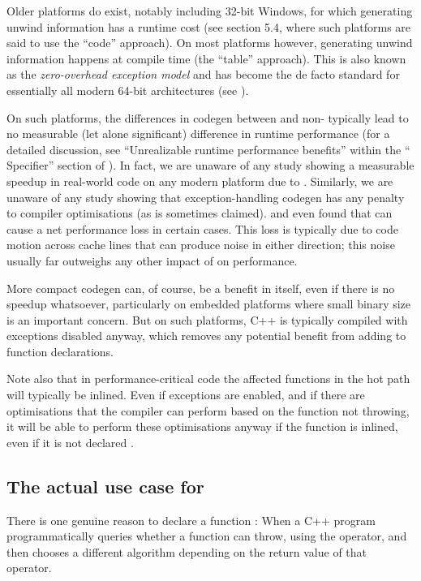 Older platforms do exist, notably including 32-bit Windows, for which generating unwind information has a runtime cost (see \cite{TR18015} section 5.4, where such platforms are said to use the ``code'' approach). On most platforms however, generating unwind information happens at compile time (the ``table'' approach). This is also known as the \emph{zero-overhead exception model} and has become the de facto standard for essentially all modern 64-bit architectures (see \cite{Mortoray2013}).

On such platforms, the differences in codegen between  and non- typically lead to no measurable (let alone significant) difference in runtime performance (for a detailed discussion, see ``Unrealizable runtime performance benefits'' within the `` Specifier'' section of \cite{EMC++S}). In fact, we are unaware of any study showing a measurable speedup in real-world code on any modern platform due to . Similarly, we are unaware of any study showing that exception-handling codegen has any penalty to compiler optimisations (as is sometimes claimed). \cite{Mahaffey2017} and \cite{Dekker2019} even found that  can cause a net performance loss in certain cases. This loss is typically due to code motion across cache lines that can produce noise in either direction; this noise usually far outweighs any other impact of  on performance.

More compact codegen can, of course, be a benefit in itself, even if there is no speedup whatsoever, particularly on embedded platforms where small binary size is an important concern. But on such platforms, C++ is typically compiled with exceptions disabled anyway, which removes any potential benefit from adding  to function declarations.

Note also that in performance-critical code the affected functions in the hot path will typically be inlined. Even if exceptions are enabled, and if there are optimisations that the compiler can perform based on the function not throwing, it will be able to perform these optimisations anyway if the function is inlined, even if it is not declared .

\subsection{The actual use case for }

There is one genuine reason to declare a function : When a C++ program programmatically queries whether a function can throw, using the  operator, and then chooses a different algorithm depending on the return value of that operator.

